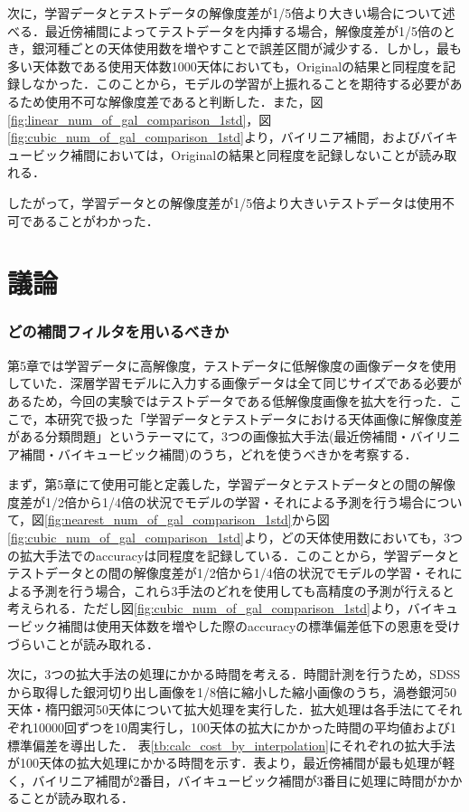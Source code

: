 \documentclass[a4j, 11pt]{jreport}
\begin{document}
次に，学習データとテストデータの解像度差が1/5倍より大きい場合について述べる．最近傍補間によってテストデータを内挿する場合，解像度差が1/5倍のとき，銀河種ごとの天体使用数を増やすことで誤差区間が減少する．しかし，最も多い天体数である使用天体数1000天体においても，Originalの結果と同程度を記録しなかった．このことから，モデルの学習が上振れることを期待する必要があるため使用不可な解像度差であると判断した．また，図\ref{fig:linear_num_of_gal_comparison_1std}，図\ref{fig:cubic_num_of_gal_comparison_1std}より，バイリニア補間，およびバイキュービック補間においては，Originalの結果と同程度を記録しないことが読み取れる．

したがって，学習データとの解像度差が1/5倍より大きいテストデータは使用不可であることがわかった．

\newpage
\section{議論}
\subsubsection{どの補間フィルタを用いるべきか}
第5章では学習データに高解像度，テストデータに低解像度の画像データを使用していた．深層学習モデルに入力する画像データは全て同じサイズである必要があるため，今回の実験ではテストデータである低解像度画像を拡大を行った．ここで，本研究で扱った「学習データとテストデータにおける天体画像に解像度差がある分類問題」というテーマにて，3つの画像拡大手法(最近傍補間・バイリニア補間・バイキュービック補間)のうち，どれを使うべきかを考察する．

まず，第5章にて使用可能と定義した，学習データとテストデータとの間の解像度差が1/2倍から1/4倍の状況でモデルの学習・それによる予測を行う場合について，図\ref{fig:nearest_num_of_gal_comparison_1std}から図\ref{fig:cubic_num_of_gal_comparison_1std}より，どの天体使用数においても，3つの拡大手法でのaccuracyは同程度を記録している．このことから，学習データとテストデータとの間の解像度差が1/2倍から1/4倍の状況でモデルの学習・それによる予測を行う場合，これら3手法のどれを使用しても高精度の予測が行えると考えられる．ただし図\ref{fig:cubic_num_of_gal_comparison_1std}より，バイキュービック補間は使用天体数を増やした際のaccuracyの標準偏差低下の恩恵を受けづらいことが読み取れる．

次に，3つの拡大手法の処理にかかる時間を考える．時間計測を行うため，SDSSから取得した銀河切り出し画像を1/8倍に縮小した縮小画像のうち，渦巻銀河50天体・楕円銀河50天体について拡大処理を実行した．拡大処理は各手法にてそれぞれ10000回ずつを10周実行し，100天体の拡大にかかった時間の平均値および1標準偏差を導出した．
表\ref{tb:calc_cost_by_interpolation}にそれぞれの拡大手法が100天体の拡大処理にかかる時間を示す．表より，最近傍補間が最も処理が軽く，バイリニア補間が2番目，バイキュービック補間が3番目に処理に時間がかかることが読み取れる．
\end{document}

